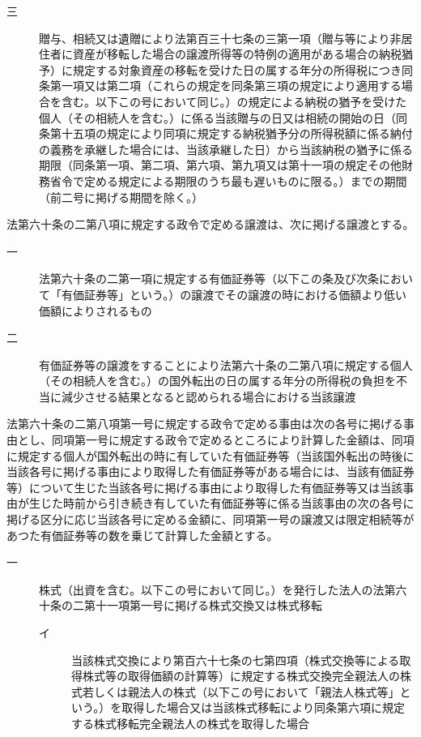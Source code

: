 \documentclass[twocolumn,a4j,10pt]{ltjtarticle}
\begin{document}
\begin{description}
\begin{description}
\item[三]贈与、相続又は遺贈により法第百三十七条の三第一項（贈与等により非居住者に資産が移転した場合の譲渡所得等の特例の適用がある場合の納税猶予）に規定する対象資産の移転を受けた日の属する年分の所得税につき同条第一項又は第二項（これらの規定を同条第三項の規定により適用する場合を含む。以下この号において同じ。）の規定による納税の猶予を受けた個人（その相続人を含む。）に係る当該贈与の日又は相続の開始の日（同条第十五項の規定により同項に規定する納税猶予分の所得税額に係る納付の義務を承継した場合には、当該承継した日）から当該納税の猶予に係る期限（同条第一項、第二項、第六項、第九項又は第十一項の規定その他財務省令で定める規定による期限のうち最も遅いものに限る。）までの期間（前二号に掲げる期間を除く。）
\end{description}
\item[\rensuji{4}]法第六十条の二第八項に規定する政令で定める譲渡は、次に掲げる譲渡とする。
\begin{description}
\item[一]法第六十条の二第一項に規定する有価証券等（以下この条及び次条において「有価証券等」という。）の譲渡でその譲渡の時における価額より低い価額によりされるもの
\item[二]有価証券等の譲渡をすることにより法第六十条の二第八項に規定する個人（その相続人を含む。）の国外転出の日の属する年分の所得税の負担を不当に減少させる結果となると認められる場合における当該譲渡
\end{description}
\item[\rensuji{5}]法第六十条の二第八項第一号に規定する政令で定める事由は次の各号に掲げる事由とし、同項第一号に規定する政令で定めるところにより計算した金額は、同項に規定する個人が国外転出の時に有していた有価証券等（当該国外転出の時後に当該各号に掲げる事由により取得した有価証券等がある場合には、当該有価証券等）について生じた当該各号に掲げる事由により取得した有価証券等又は当該事由が生じた時前から引き続き有していた有価証券等に係る当該事由の次の各号に掲げる区分に応じ当該各号に定める金額に、同項第一号の譲渡又は限定相続等があつた有価証券等の数を乗じて計算した金額とする。
\begin{description}
\item[一]株式（出資を含む。以下この号において同じ。）を発行した法人の法第六十条の二第十一項第一号に掲げる株式交換又は株式移転
\begin{description}
\item[イ]当該株式交換により第百六十七条の七第四項（株式交換等による取得株式等の取得価額の計算等）に規定する株式交換完全親法人の株式若しくは親法人の株式（以下この号において「親法人株式等」という。）を取得した場合又は当該株式移転により同条第六項に規定する株式移転完全親法人の株式を取得した場合

\end{description}
\end{description}
\end{description}
\end{document}
